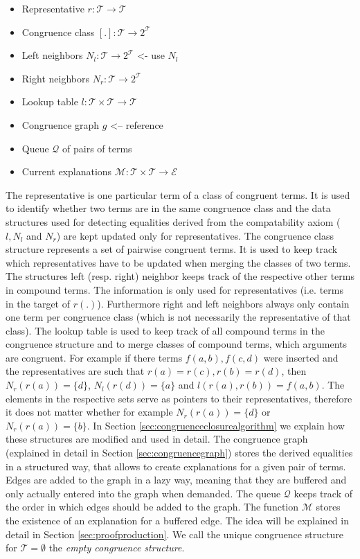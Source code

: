 \begin{itemize}
	\item Representative $r: \mathcal{T} \rightarrow \mathcal{T}$
	\item Congruence class $[.]: \mathcal{T} \rightarrow 2^\mathcal{T}$
	\item Left neighbors $N_l: \mathcal{T} \rightarrow 2^\mathcal{T}$ <- use $N_l$
	\item Right neighbors $N_r: \mathcal{T} \rightarrow 2^\mathcal{T}$
	\item Lookup table $l: \mathcal{T} \times \mathcal{T} \rightarrow \mathcal{T}$
	\item Congruence graph $g$ <-- reference
	\item Queue $\mathcal{Q}$ of pairs of terms %
	\item Current explanations $\mathcal{M}: \mathcal{T} \times \mathcal{T} \rightarrow \mathcal{E}$
\end{itemize}

The representative is one particular term of a class of congruent terms.
It is used to identify whether two terms are in the same congruence class and the data structures used for detecting equalities derived from the compatability axiom ($l, N_l$ and $N_r$) are kept updated only for representatives.
The congruence class structure represents a set of pairwise congruent terms.
It is used to keep track which representatives have to be updated when merging the classes of two terms.
The structures left (resp. right) neighbor keeps track of the respective other terms in compound terms.
The information is only used for representatives (i.e. terms in the target of $r(.)$).
Furthermore right and left neighbors always only contain one term per congruence class (which is not necessarily the representative of that class).
The lookup table is used to keep track of all compound terms in the congruence structure and to merge classes of compound terms, which arguments are congruent.
For example if there terms $f(a,b),f(c,d)$ were inserted and the representatives are such that $r(a) = r(c), r(b) = r(d)$, then $N_r(r(a)) = \{d\}$, $N_l(r(d)) = \{a\}$ and $l(r(a),r(b)) = f(a,b)$.
The elements in the respective sets serve as pointers to their representatives, therefore it does not matter whether for example $N_r(r(a)) = \{d\}$ or $N_r(r(a)) = \{b\}$.
In Section \ref{sec:congruenceclosurealgorithm} we explain how these structures are modified and used in detail.
The congruence graph (explained in detail in Section \ref{sec:congruencegraph}) stores the derived equalities in a structured way, that allows to create explanations for a given pair of terms.
Edges are added to the graph in a lazy way, meaning that they are buffered and only actually entered into the graph when demanded.
The queue $\mathcal{Q}$ keeps track of the order in which edges should be added to the graph.
The function $\mathcal{M}$ stores the existence of an explanation for a buffered edge.
The idea will be explained in detail in Section \ref{sec:proofproduction}.
We call the unique congruence structure for $\mathcal{T} = \emptyset$ the \emph{empty congruence structure}.

